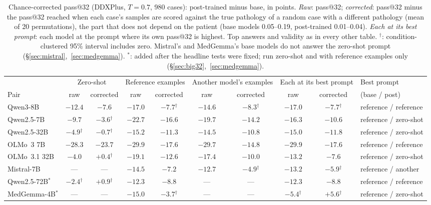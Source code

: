 \documentclass[11pt]{article}
\begin{document}
\begin{table}[t]
\centering\small
\setlength{\tabcolsep}{3.5pt}
\begin{adjustbox}{max width=\linewidth}
\begin{tabular}{lccccccccl}
\toprule
 & \multicolumn{2}{c}{Zero-shot} & \multicolumn{2}{c}{Reference examples} & \multicolumn{2}{c}{Another model's examples} & \multicolumn{2}{c}{Each at its best prompt} & Best prompt \\
Pair & raw & corrected & raw & corrected & raw & corrected & raw & corrected & (base / post) \\
\midrule
Qwen3-8B & $-12.4$ & $-7.6$ & $-17.0$ & $-7.7$$^{\dagger}$ & $-14.6$ & $-8.3$$^{\dagger}$ & $-17.0$ & $-7.7$$^{\dagger}$ & reference / reference \\
Qwen2.5-7B & $-9.7$ & $-3.6$$^{\dagger}$ & $-22.7$ & $-16.6$ & $-19.7$ & $-14.2$ & $-16.3$ & $-10.6$ & reference / zero-shot \\
Qwen2.5-32B & $-4.9$$^{\dagger}$ & $-0.7$$^{\dagger}$ & $-15.2$ & $-11.3$ & $-14.5$ & $-10.8$ & $-15.0$ & $-11.8$ & reference / zero-shot \\
OLMo~3 7B & $-28.3$ & $-23.7$ & $-29.9$ & $-17.6$ & $-29.7$ & $-14.8$ & $-29.9$ & $-17.6$ & reference / reference \\
OLMo~3.1 32B & $-4.0$ & $+0.4$$^{\dagger}$ & $-19.1$ & $-12.6$ & $-17.4$ & $-10.0$ & $-13.2$ & $-7.6$ & reference / zero-shot \\
Mistral-7B & --- & --- & $-14.5$ & $-7.2$ & $-12.7$ & $-4.9$$^{\dagger}$ & $-13.2$ & $-5.9$$^{\dagger}$ & reference / another \\
Qwen2.5-72B$^{*}$ & $-2.4$$^{\dagger}$ & $+0.9$$^{\dagger}$ & $-12.3$ & $-8.8$ & --- & --- & $-12.3$ & $-8.8$ & reference / reference \\
MedGemma-4B$^{*}$ & --- & --- & $-15.0$ & $-3.7$$^{\dagger}$ & --- & --- & $-5.4$$^{\dagger}$ & $+5.6$$^{\dagger}$ & reference / zero-shot \\
\bottomrule
\end{tabular}
\end{adjustbox}
\caption{Chance-corrected pass@32 (DDXPlus, $T{=}0.7$, 980 cases): post-trained minus base, in points. \emph{Raw}: pass@32; \emph{corrected}: pass@32 minus the pass@32 reached when each case's samples are scored against the true pathology of a random case with a different pathology (mean of 20 permutations), the part that does not depend on the patient (base models 0.05--0.19, post-trained 0.01--0.04). \emph{Each at its best prompt}: each model at the prompt where its own pass@32 is highest. Top answers and validity as in every other table. $^{\dagger}$: condition-clustered 95\% interval includes zero. Mistral's and MedGemma's base models do not answer the zero-shot prompt (\S\ref{sec:mistral},~\ref{sec:medgemma}). $^{*}$: added after the headline tests were fixed; run zero-shot and with reference examples only (\S\ref{sec:big32},~\ref{sec:medgemma}).}
\label{tab:chance}
\end{table}
\end{document}
